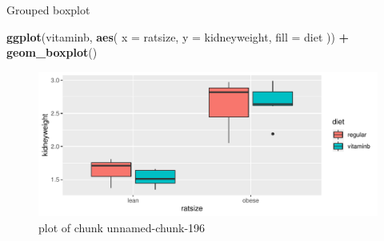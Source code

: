 \documentclass[ignorenonframetext,]{beamer}
\newenvironment{Shaded}{\begin{snugshade}}{\end{snugshade}}
\newcommand{\DataTypeTok}[1]{\textcolor[rgb]{0.13,0.29,0.53}{#1}}
\newcommand{\KeywordTok}[1]{\textcolor[rgb]{0.13,0.29,0.53}{\textbf{#1}}}
\newcommand{\NormalTok}[1]{#1}
\newcommand{\OperatorTok}[1]{\textcolor[rgb]{0.81,0.36,0.00}{\textbf{#1}}}
\newcommand{\StringTok}[1]{\textcolor[rgb]{0.31,0.60,0.02}{#1}}
\begin{document}
\begin{frame}[fragile]{Grouped boxplot}
\protect\hypertarget{grouped-boxplot}{}

\begin{Shaded}
\begin{Highlighting}[]
\KeywordTok{ggplot}\NormalTok{(vitaminb, }\KeywordTok{aes}\NormalTok{(}
  \DataTypeTok{x =}\NormalTok{ ratsize, }\DataTypeTok{y =}\NormalTok{ kidneyweight,}
  \DataTypeTok{fill =}\NormalTok{ diet}
\NormalTok{)) }\OperatorTok{+}\StringTok{ }\KeywordTok{geom_boxplot}\NormalTok{()}
\end{Highlighting}
\end{Shaded}

\begin{figure}
\centering
\includegraphics{figure/unnamed-chunk-196-1.pdf}
\caption{plot of chunk unnamed-chunk-196}
\end{figure}

\end{frame}
\end{document}
